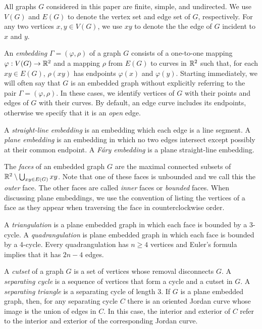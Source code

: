 \documentclass{patmorin}
\begin{document}
All graphs $G$ considered in this paper are finite, simple, and
undirected.   We use $V(G)$ and $E(G)$ to denote the vertex set and edge
set of $G$, respectively. For any two vertices $x,y\in V(G)$, we use $xy$
to denote the the edge of $G$ incident to $x$ and $y$.

An \emph{embedding} $\Gamma=(\varphi,\rho)$ of a graph $G$ consists
of a one-to-one mapping $\varphi:V(G)\to\mathbb{R}^2$ and a mapping $\rho$ from
$E(G)$ to curves in $\mathbb{R}^2$ such that, for each $xy\in E(G)$, $\rho(xy)$
has endpoints $\varphi(x)$ and $\varphi(y)$.
Starting immediately,  we will often say that $G$ is an embedded graph
without explicitly referring to the pair $\Gamma=(\varphi,\rho)$.
In these cases, we identify vertices of $G$ with their
points and edges of $G$ with their curves. By default, an edge curve includes
its endpoints, otherwise we specify that it is an \emph{open} edge.

A \emph{straight-line embedding} is
an embedding which each edge is a line segment.  A \emph{plane embedding}
is an embedding in which no two edges intersect except possibly at their
common endpoint.  A \emph{Fáry embedding} is a plane straight-line
embedding.

The \emph{faces} of an embedded graph $G$ are the maximal connected
subsets of $\mathbb{R}^2\setminus\bigcup_{xy\in E(G)} xy$.  Note that one of
these faces is unbounded and we call this the \emph{outer} face. The
other faces are called \emph{inner} faces or \emph{bounded} faces.
When discussing plane embeddings, we use the convention of listing
the vertices of a face as they appear when traversing the face in
counterclockwise order.

A \emph{triangulation} is a plane embedded graph in which each face is
bounded by a 3-cycle.  A \emph{quadrangulation} is plane embedded graph
in which each face is bounded by a 4-cycle. Every quadrangulation has
$n\ge 4$ vertices and Euler's formula implies that it has $2n-4$ edges.

A \emph{cutset} of a graph $G$ is a set of vertices whose removal
disconnects $G$.  A \emph{separating cycle} is a sequence of vertices
that form a cycle and a cutset in $G$.  A \emph{separating triangle} is
a separating cycle of length 3.  If $G$ is a plane embedded graph, then,
for any separating cycle $C$ there is an oriented Jordan curve whose image
is the union of edges in $C$.  In this case, the interior and exterior of
$C$ refer to the interior and exterior of the corresponding Jordan curve.
\end{document}
